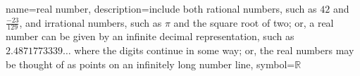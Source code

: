 %	
%


{
	name={real number},
	description={include both rational numbers, such as $42$ and 
		$\frac{-23}{129}$, and irrational numbers, 
		such as $\pi$ and the square root of two; or,
		a real number can be given by an infinite decimal
		representation, such as $2.4871773339\ldots$ where
		the digits continue in some way; or, the real
		numbers may be thought of as points on an infinitely
		long number line},
	symbol={\ensuremath{\mathbb{R}}}
}